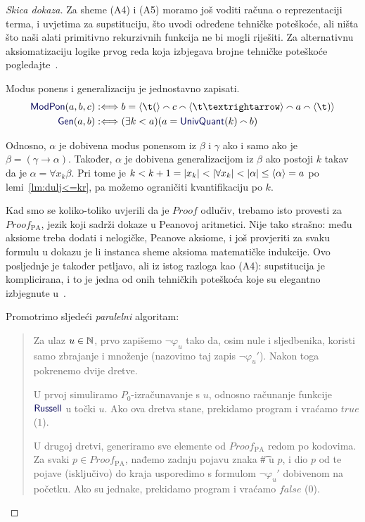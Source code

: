 \begin{proof}[Skica dokaza]
Za sheme (A4) i (A5) moramo još voditi računa o reprezentaciji terma, i uvjetima za supstituciju, što uvodi određene tehničke poteškoće, ali ništa što naši alati primitivno rekurzivnih funkcija ne bi mogli riješiti. Za alternativnu aksiomatizaciju logike prvog reda koja izbjegava brojne tehničke poteškoće pogledajte~\cite{smullyan}.

Modus ponens i generalizaciju je jednostavno zapisati.
\begin{align}
    \f{ModPon}(a,b,c)&:\Longleftrightarrow b=
    \kr{\t(}\conc{}
    c\conc{}
    \kr{\t\textrightarrow}\conc{}
    a\conc{}\kr{\t)}\\
    \f{Gen}(a,b)&:\Longleftrightarrow
    (\exists k<a)(a=\f{UnivQuant}(k)\conc{}b)
\end{align}

Odnosno, $\alpha$ je dobivena modus ponensom iz $\beta$ i $\gamma$ ako i samo ako je $\beta=(\gamma\to\alpha)$. Također, $\alpha$ je dobivena generalizacijom iz $\beta$ ako postoji $k$ takav da je $\alpha=\forall x_k\beta$. Pri tome je $k<k+1=\lvert x_k\rvert<\lvert\forall x_k\rvert<\lvert\alpha\rvert\le\langle\alpha\rangle=a$ po lemi~\ref{lm:dulj<=kr}, pa možemo ograničiti kvantifikaciju po $k$.

    Kad smo se koliko-toliko uvjerili da je $Proof$ odlučiv, trebamo isto provesti za $Proof_{\text{PA}}$, jezik koji sadrži dokaze u Peanovoj aritmetici. Nije tako strašno: među aksiome treba dodati i nelogičke, Peanove aksiome, i još provjeriti za svaku formulu u dokazu je li instanca sheme aksioma matematičke indukcije. Ovo posljednje je također petljavo, ali iz istog razloga kao (A4): supstitucija je komplicirana, i to je jedna od onih tehničkih poteškoća koje su elegantno izbjegnute u~\cite{smullyan}.

Promotrimo sljedeći \emph{paralelni} algoritam:
\begin{quote}
    Za ulaz $u\in{\mathbb N}$, prvo zapišemo $\neg\varphi_u$ tako da, osim nule i sljedbenika, koristi samo zbrajanje i množenje (nazovimo taj zapis $\neg\varphi_u'$). Nakon toga pokrenemo dvije dretve.

    U prvoj simuliramo $P_0$-izračunavanje s $u$, odnosno računanje funkcije $\f{Russell}$ u točki $u$. Ako ova dretva stane, prekidamo program i vraćamo $\mathit{true}$ ($1$).

    U drugoj dretvi, generiramo sve elemente od $Proof_{\text{PA}}$ redom po kodovima. Za svaki $p\in Proof_{\text{PA}}$, nađemo zadnju pojavu znaka \t\# u $p$, i dio $p$ od te pojave (isključivo) do kraja usporedimo s formulom $\neg\varphi_u'$ dobivenom na početku. Ako su jednake, prekidamo program i vraćamo $\mathit{false}$ ($0$).
\end{quote}


\end{proof}
